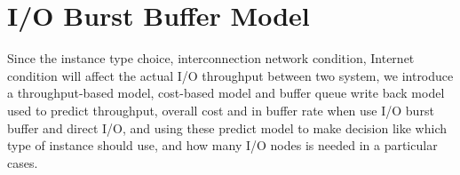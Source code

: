 \section{I/O Burst Buffer Model}
\label{sec:model}

Since the instance type choice, interconnection network condition, Internet condition will affect the actual I/O throughput between two system, we introduce a throughput-based model, cost-based model and buffer queue write back model used to predict throughput, overall cost and in buffer rate when use I/O burst buffer and direct I/O, and using these predict model to make decision like which type of instance should use, and how many I/O nodes is needed in a particular cases.

